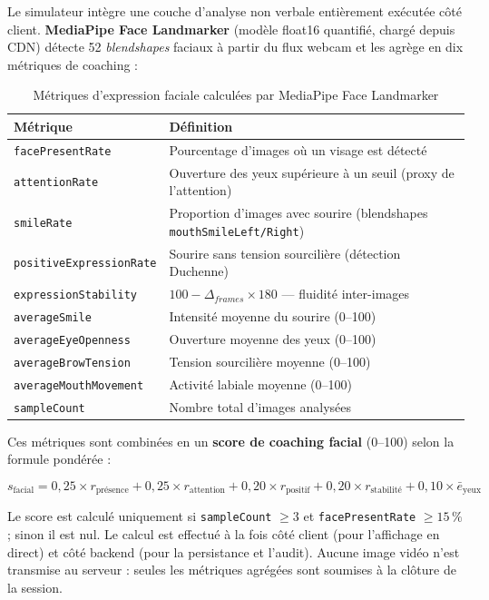 ﻿\documentclass[12pt,a4paper]{report}
\begin{document}
Le simulateur intègre une couche d'analyse non verbale entièrement exécutée côté client. \textbf{MediaPipe Face Landmarker} (modèle float16 quantifié, chargé depuis CDN) détecte 52 \textit{blendshapes} faciaux à partir du flux webcam et les agrège en dix métriques de coaching :

\begin{table}[H]
\centering
\begin{tabularx}{\textwidth}{lX}
\toprule
\textbf{Métrique} & \textbf{Définition} \\
\midrule
\texttt{facePresentRate} & Pourcentage d'images où un visage est détecté \\
\texttt{attentionRate} & Ouverture des yeux supérieure à un seuil (proxy de l'attention) \\
\texttt{smileRate} & Proportion d'images avec sourire (blendshapes \texttt{mouthSmileLeft/Right}) \\
\texttt{positiveExpressionRate} & Sourire sans tension sourcilière (détection Duchenne) \\
\texttt{expressionStability} & $100 - \Delta_{frames} \times 180$ — fluidité inter-images \\
\texttt{averageSmile} & Intensité moyenne du sourire (0--100) \\
\texttt{averageEyeOpenness} & Ouverture moyenne des yeux (0--100) \\
\texttt{averageBrowTension} & Tension sourcilière moyenne (0--100) \\
\texttt{averageMouthMovement} & Activité labiale moyenne (0--100) \\
\texttt{sampleCount} & Nombre total d'images analysées \\
\bottomrule
\end{tabularx}
\caption{Métriques d'expression faciale calculées par MediaPipe Face Landmarker}
\end{table}

Ces métriques sont combinées en un \textbf{score de coaching facial} (0--100) selon la formule pondérée :

\begin{equation}
\label{eq:facial}
s_{\text{facial}} = 0{,}25 \times r_{\text{présence}} + 0{,}25 \times r_{\text{attention}} + 0{,}20 \times r_{\text{positif}} + 0{,}20 \times r_{\text{stabilité}} + 0{,}10 \times \bar{e}_{\text{yeux}}
\end{equation}

Le score est calculé uniquement si \texttt{sampleCount} $\geq 3$ et \texttt{facePresentRate} $\geq 15\,\%$ ; sinon il est nul. Le calcul est effectué à la fois côté client (pour l'affichage en direct) et côté backend (pour la persistance et l'audit). Aucune image vidéo n'est transmise au serveur : seules les métriques agrégées sont soumises à la clôture de la session.
\end{document}
